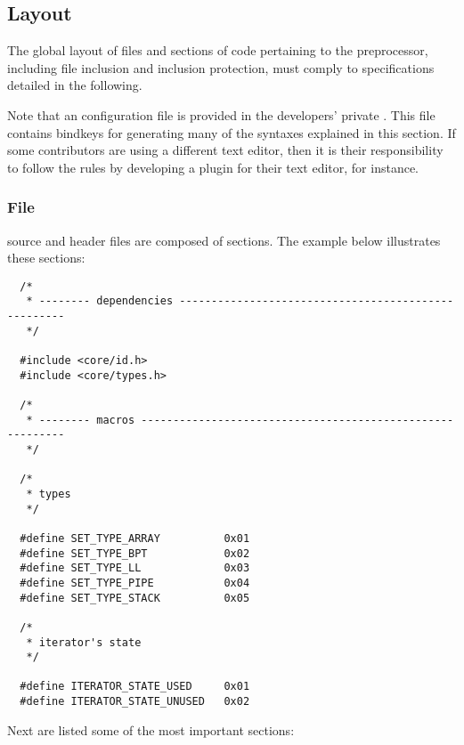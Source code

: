 %
%

\subsection{Layout}

The global layout of files and sections of code pertaining to the 
preprocessor, including file inclusion and inclusion protection, must
comply to specifications detailed in the following.

Note that an  configuration file is provided in the
developers' private . This file contains bindkeys for generating
many of the syntaxes explained in this section. If some contributors are using
a different text editor, then it is their responsibility to follow the rules
by developing a plugin for their text editor, for instance.


\subsubsection{File}

 source and header files are composed of sections. The example
below illustrates these sections:

\begin{verbatim}
  /*
   * -------- dependencies ----------------------------------------------------
   */

  #include <core/id.h>
  #include <core/types.h>

  /*
   * -------- macros ----------------------------------------------------------
   */

  /*
   * types
   */

  #define SET_TYPE_ARRAY          0x01
  #define SET_TYPE_BPT            0x02
  #define SET_TYPE_LL             0x03
  #define SET_TYPE_PIPE           0x04
  #define SET_TYPE_STACK          0x05

  /*
   * iterator's state
   */

  #define ITERATOR_STATE_USED     0x01
  #define ITERATOR_STATE_UNUSED   0x02
\end{verbatim}

Next are listed some of the most important sections:

